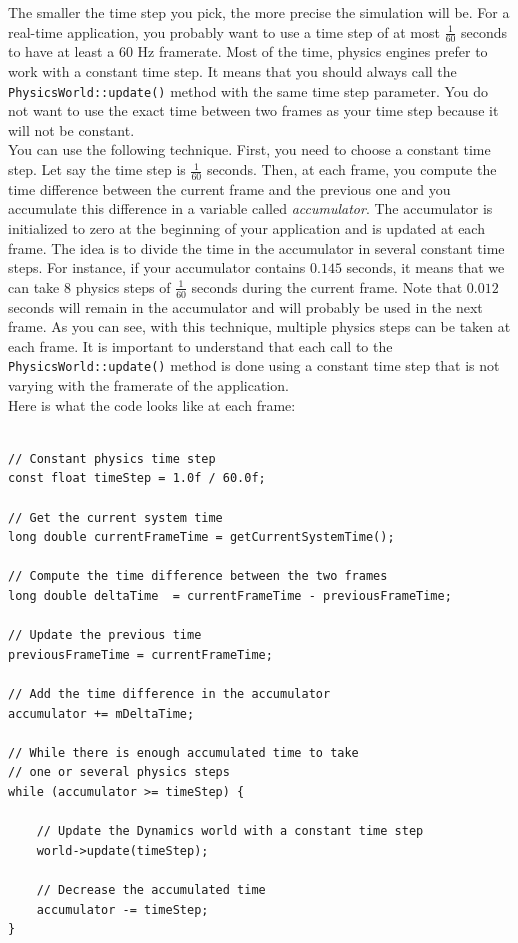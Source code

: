\documentclass[a4paper,12pt]{article}
\begin{document}
    The smaller the time step you pick, the more precise the simulation will be. For a real-time application, you probably want to use a time step of
    at most $\frac{1}{60}$ seconds to have at least a 60 Hz framerate. Most of the time, physics engines prefer to work with a constant time step.
    It means that you should always call the \texttt{PhysicsWorld::update()} method with the same time step parameter. You do not want to use the exact time
    between two frames as your time step because it will not be constant. \\

    You can use the following technique. First, you need to choose a constant time step. Let say the time step is $\frac{1}{60}$ seconds.
    Then, at each frame, you compute the time difference between the current frame and the previous one and you accumulate this difference in a variable
    called \emph{accumulator}. The accumulator is initialized to zero at the beginning of your application and is updated at each frame. The idea is to
    divide the time in the accumulator in several constant time steps.  For instance, if your accumulator contains $0.145$ seconds, it means that
    we can take $8$ physics steps of $\frac{1}{60}$ seconds during the current frame. Note that $0.012$ seconds will remain in the accumulator
    and will probably be used in the next frame. As you can see, with this technique, multiple physics steps can be taken at each frame.
    It is important to understand that each call to the \texttt{PhysicsWorld::update()} method is done using a constant time step that is
    not varying with the framerate of the application. \\

    Here is what the code looks like at each frame: \\

    \begin{lstlisting}

// Constant physics time step
const float timeStep = 1.0f / 60.0f;

// Get the current system time
long double currentFrameTime = getCurrentSystemTime();

// Compute the time difference between the two frames
long double deltaTime  = currentFrameTime - previousFrameTime;

// Update the previous time
previousFrameTime = currentFrameTime;

// Add the time difference in the accumulator
accumulator += mDeltaTime;

// While there is enough accumulated time to take
// one or several physics steps
while (accumulator >= timeStep) {

    // Update the Dynamics world with a constant time step
    world->update(timeStep);

    // Decrease the accumulated time
    accumulator -= timeStep;
}

    \end{lstlisting}
\end{document}
